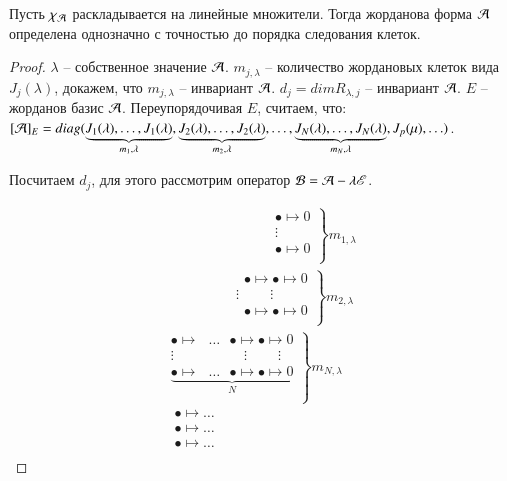 \documentclass[main]{subfiles}
\begin{document}
\begin{proposition}
  Пусть $\chi_{\mathcal{A}}$ раскладывается на линейные множители. Тогда жорданова форма $\mathcal{A}$
  определена однозначно с точностью до порядка следования клеток.
\end{proposition}

\begin{proof}
  $\lambda$ -- собственное значение $\mathcal{A}$. $m_{j, \lambda}$ -- количество жордановых клеток вида
  $J_j(\lambda)$, докажем, что $m_{j, \lambda}$ -- инвариант $\mathcal{A}$. $d_j = dim R_{\lambda, j}$ -- инвариант $\mathcal{A}$.
  $E$ -- жорданов базис $\mathcal{A}$. Переупорядочивая $E$, считаем, что:
  $[\mathcal{A}]_E = diag(\underbrace{J_1(\lambda), \ldots, J_1(\lambda)}_{m_1, \lambda}, \underbrace{J_2(\lambda), \ldots, J_2(\lambda)}_{m_2, \lambda}, \ldots, \underbrace{J_N(\lambda), \ldots, J_N(\lambda)}_{m_N, \lambda}, J_p(\mu), \ldots)$.



\newpage

Посчитаем $d_j$, для этого рассмотрим оператор $\mathcal{B} = \mathcal{A} - \lambda \mathscr{E}$.

\begin{gather*}
  \left.
  \begin{array}{ccc}
    \ \quad \quad \quad \quad \quad \quad \quad \ \bullet\longmapsto 0 \\
    \ \quad \quad \quad \quad \quad \quad \quad \ \vdots               \\
    \ \quad \quad \quad \quad \quad \quad \quad \ \bullet\longmapsto 0 \\
  \end{array}
  \right\} m_{1,\lambda} \\
  \left.
  \begin{array}{ccc}
    \ \quad \quad \quad \quad \quad \bullet \longmapsto \bullet \longmapsto 0  \\
    \ \quad \quad \quad \quad \ \ \vdots \quad \quad \ \vdots                  \\
    \ \quad \quad \quad \quad \quad  \bullet \longmapsto \bullet \longmapsto 0 \\
  \end{array}
  \right\} m_{2,\lambda} \\
  \left.
  \begin{array}{ccc}
    \bullet \longmapsto \ \ \  \dots \ \ \  \bullet\longmapsto\bullet\longmapsto 0                 \\
    \vdots \quad \quad \quad \quad \quad  \vdots \quad \quad \ \vdots                              \\
    \underbrace{\bullet\longmapsto \ \ \  \dots \ \ \  \bullet\longmapsto\bullet\longmapsto 0}_{N} \\
  \end{array}
  \right\} m_{N,\lambda} \\
  \text{ } \bullet\longmapsto \dots \\
  \text{ } \bullet\longmapsto \dots \\
  \text{ } \bullet\longmapsto \dots \\
\end{gather*}


\end{proof}
\end{document}
